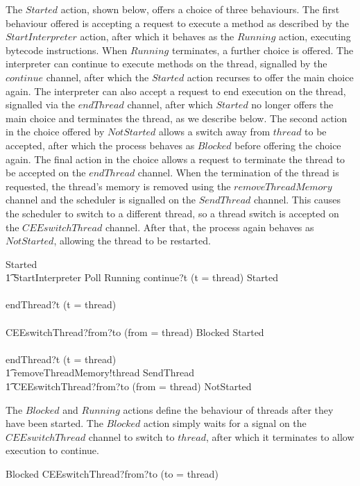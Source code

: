 The $Started$ action, shown below, offers a choice of three
behaviours.
The first behaviour offered is accepting a request to execute a method
as described by the $StartInterpreter$ action, after which it behaves
as the $Running$ action, executing bytecode instructions.
When $Running$ terminates, a further choice is offered.
The interpreter can continue to execute methods on the thread,
signalled by the $continue$ channel, after which the $Started$ action
recurses to offer the main choice again.
The interpreter can also accept a request to end execution on the
thread, signalled via the $endThread$ channel, after which $Started$
no longer offers the main choice and terminates the thread, as we
describe below.
The second action in the choice offered by $NotStarted$ allows a
switch away from $thread$ to be accepted, after which the process
behaves as $Blocked$ before offering the choice again.
The final action in the choice allows a request to terminate the
thread to be accepted on the $endThread$ channel.
When the termination of the thread is requested, the thread's memory
is removed using the $removeThreadMemory$ channel and the scheduler is
signalled on the $SendThread$ channel.
This causes the scheduler to switch to a different thread, so a thread
switch is accepted on the $CEEswitchThread$ channel.
After that, the process again behaves as $NotStarted$, allowing the
thread to be restarted.
{\setlength{\zedtab}{0.4cm}
\begin{circusaction}
  Started \circdef \\
  \t1 \circblockbegin
  StartInterpreter \circseq Poll \circseq Running \circseq \circblockbegin
  continue?t \prefixcolon (t = thread) \then Started \\
  {} \extchoice {} \\
  endThread?t \prefixcolon (t = thread) \then \Skip
  \circblockend \\
  {} \extchoice {} \\
  CEEswitchThread?from?to \prefixcolon (from = thread) \then Blocked \circseq Started \\
  {} \extchoice {} \\
  endThread?t \prefixcolon (t = thread) \then \Skip
  \circblockend \circseq \\
  \t1 removeThreadMemory!thread \then SendThread \\
  \t1 {} \then CEEswitchThread?from?to \prefixcolon (from = thread) \then NotStarted
\end{circusaction}}

The $Blocked$ and $Running$ actions define the behaviour of threads
after they have been started.
The $Blocked$ action simply waits for a signal on the
$CEEswitchThread$ channel to switch to $thread$, after which it
terminates to allow execution to continue.
\begin{circusaction}
  Blocked \circdef CEEswitchThread?from?to \prefixcolon (to = thread) \then \Skip
\end{circusaction}

